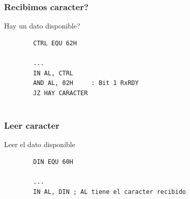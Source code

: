 \documentclass{beamer}
\begin{document}
\begin{frame}[fragile]
\frametitle{Recibimos caracter?}
\begin{block}{Hay un dato disponible?}
 \begin{verbatim}
        CTRL EQU 62H
         
        ...
        IN AL, CTRL
        AND AL, 02H     : Bit 1 RxRDY
        JZ HAY CARACTER
             
 \end{verbatim}
\end{block}

\end{frame}

\begin{frame}[fragile]
\frametitle{Leer caracter}
\begin{block}{Leer el dato disponible}
 \begin{verbatim}
        DIN EQU 60H
         
        ...
        IN AL, DIN ; AL tiene el caracter recibido
        
 \end{verbatim}
\end{block}

\end{frame}
\end{document}
